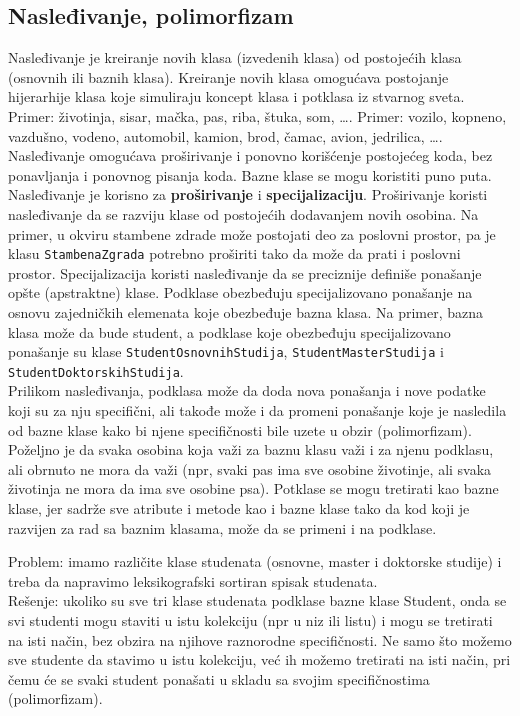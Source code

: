 \documentclass[../main.tex]{subfiles}
\begin{document}
\subsection{Nasleđivanje, polimorfizam}
Nasleđivanje je kreiranje novih klasa (izvedenih klasa) od postojećih klasa (osnovnih ili baznih klasa). Kreiranje novih klasa omogućava postojanje hijerarhije klasa koje simuliraju koncept klasa i potklasa iz stvarnog sveta. Primer: životinja, sisar, mačka, pas, riba, štuka, som, \ldots. Primer: vozilo, kopneno, vazdušno, vodeno, automobil, kamion, brod, čamac, avion, jedrilica, \ldots. Nasleđivanje omogućava proširivanje i ponovno korišćenje postojećeg koda, bez ponavljanja i ponovnog pisanja koda. Bazne klase se mogu koristiti puno puta.
\\
Nasleđivanje je korisno za {\bf proširivanje} i {\bf specijalizaciju}. Proširivanje koristi nasleđivanje da se razviju klase od postojećih dodavanjem novih osobina. Na primer, u okviru stambene zdrade može postojati deo za poslovni prostor, pa je klasu \texttt{StambenaZgrada} potrebno proširiti tako da može da prati i poslovni prostor. Specijalizacija koristi nasleđivanje da se preciznije definiše ponašanje opšte (apstraktne) klase. Podklase obezbeđuju specijalizovano ponašanje na osnovu zajedničkih elemenata koje obezbeđuje bazna klasa. Na primer, bazna klasa može da bude student, a podklase koje obezbeđuju specijalizovano ponašanje su klase \texttt{StudentOsnovnihStudija}, \texttt{StudentMasterStudija} i \texttt{StudentDoktorskihStudija}.
\\
Prilikom nasleđivanja, podklasa može da doda nova ponašanja i nove podatke koji su za nju specifični, ali takođe može i da promeni ponašanje koje je nasledila od bazne klase kako bi njene specifičnosti bile uzete u obzir (polimorfizam). Poželjno je da svaka osobina koja važi za baznu klasu važi i za njenu podklasu, ali obrnuto ne mora da važi (npr, svaki pas ima sve osobine životinje, ali svaka životinja ne mora da ima sve osobine psa). Potklase se mogu tretirati kao bazne klase, jer sadrže sve atribute i metode kao i bazne klase tako da kod koji je razvijen za rad sa baznim klasama, može da se primeni i na podklase.

\begin{boxprimer}
Problem: imamo različite klase studenata (osnovne, master i doktorske studije) i treba da napravimo leksikografski sortiran spisak studenata.\\
Rešenje: ukoliko su sve tri klase studenata podklase bazne klase Student, onda se svi studenti mogu staviti u istu kolekciju (npr u niz ili listu) i mogu se tretirati na isti način, bez obzira na njihove raznorodne specifičnosti. Ne samo što možemo sve studente da stavimo u istu kolekciju, već ih možemo tretirati na isti način, pri čemu će se svaki student ponašati u skladu sa svojim specifičnostima (polimorfizam).
\end{boxprimer}
\end{document}
